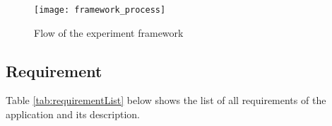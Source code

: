 \begin{figure}[!b]
\texttt{[image: framework\_process]}
\centering
\captionsetup{justification=centering}
\caption{Flow of the experiment framework}
\label{fig:mainline}
\end{figure}

\subsection{Requirement}

Table \ref{tab:requirementList} below shows the list of all requirements of the application and its description.

